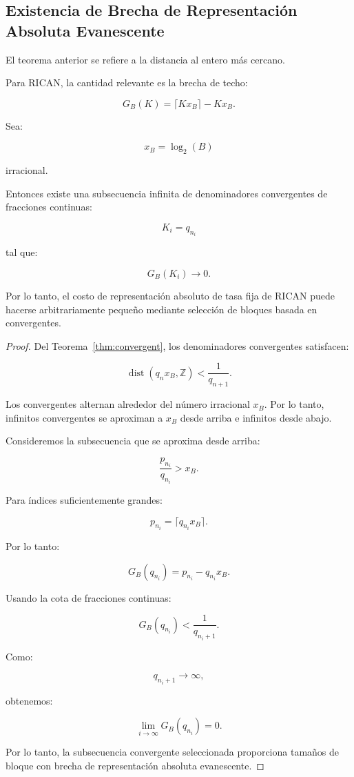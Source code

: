 \documentclass[onecolumn]{IEEEtran}
\begin{document}
\subsection{Existencia de Brecha de Representación Absoluta Evanescente}

El teorema anterior se refiere a la distancia al entero más cercano.

Para RICAN, la cantidad relevante es la brecha de techo:

\[
G_B(K)
=
\lceil Kx_B\rceil-Kx_B .
\]

\begin{theorem}
\label{thm:abs_overhead}

Sea:

\[
x_B=\log_2(B)
\]

irracional.

Entonces existe una subsecuencia infinita de denominadores
convergentes de fracciones continuas:

\[
K_i=q_{n_i}
\]

tal que:

\[
G_B(K_i)\rightarrow0 .
\]

Por lo tanto, el costo de representación absoluto de tasa fija de
RICAN puede hacerse arbitrariamente pequeño mediante selección de
bloques basada en convergentes.

\end{theorem}

\begin{proof}

Del Teorema~\ref{thm:convergent}, los denominadores convergentes
satisfacen:

\[
\operatorname{dist}(q_nx_B,\mathbb{Z})
<
\frac{1}{q_{n+1}} .
\]

Los convergentes alternan alrededor del número irracional $x_B$.
Por lo tanto, infinitos convergentes se aproximan a $x_B$ desde
arriba e infinitos desde abajo.

Consideremos la subsecuencia que se aproxima desde arriba:

\[
\frac{p_{n_i}}{q_{n_i}}>x_B .
\]

Para índices suficientemente grandes:

\[
p_{n_i}
=
\lceil q_{n_i}x_B\rceil .
\]

Por lo tanto:

\[
G_B(q_{n_i})
=
p_{n_i}-q_{n_i}x_B .
\]

Usando la cota de fracciones continuas:

\[
G_B(q_{n_i})
<
\frac{1}{q_{n_i+1}} .
\]

Como:

\[
q_{n_i+1}\rightarrow\infty ,
\]

obtenemos:

\[
\lim_{i\rightarrow\infty}
G_B(q_{n_i})
=
0 .
\]

Por lo tanto, la subsecuencia convergente seleccionada proporciona
tamaños de bloque con brecha de representación absoluta evanescente.

\end{proof}
\end{document}
